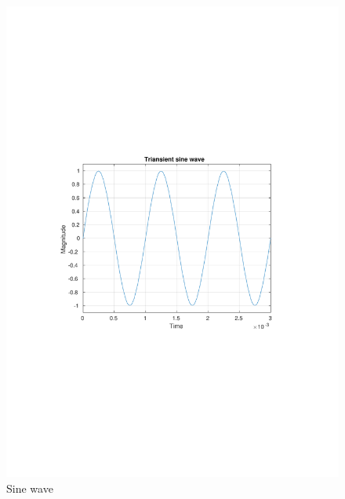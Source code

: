 \documentclass[12pt,a4paper,UKenglish]{article}
\begin{document}
\begin{figure} [htbp]
  \centering 
  \includegraphics[width=\textwidth]{img/2a_tran.pdf} 
  \caption{Sine wave}
  \label{tran_sin} 
\end{figure}
\end{document}
